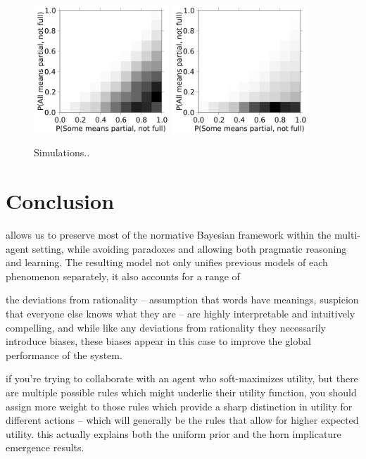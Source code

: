 \documentclass{article} %
\begin{document}
\begin{figure}
\centering
\includegraphics[width=2in]{figures/some-all-only-pragmatic.pdf}
\includegraphics[width=2in]{figures/some-all-pragmatic+unambiguous.pdf}
\caption{\label{fig:scalar} Simulations..}
\end{figure}

\section{Conclusion}

allows us to preserve most of the normative Bayesian framework within the multi-agent setting, while avoiding paradoxes and allowing both pragmatic reasoning and learning. The resulting model not only unifies previous models of each phenomenon separately, it also accounts for a range of 

the deviations from rationality -- assumption that words have meanings, suspicion that everyone else knows what they are -- are highly interpretable and intuitively compelling, and while like any deviations from rationality they necessarily introduce biases, these biases appear in this case to improve the global performance of the system. 

if you're trying to collaborate with an agent who soft-maximizes utility, but there are multiple possible rules which might underlie their utility function, you should assign more weight to those rules which provide a sharp distinction in utility for different actions -- which will generally be the rules that allow for higher expected utility. this actually explains both the uniform prior and the horn implicature emergence results.
\end{document}
